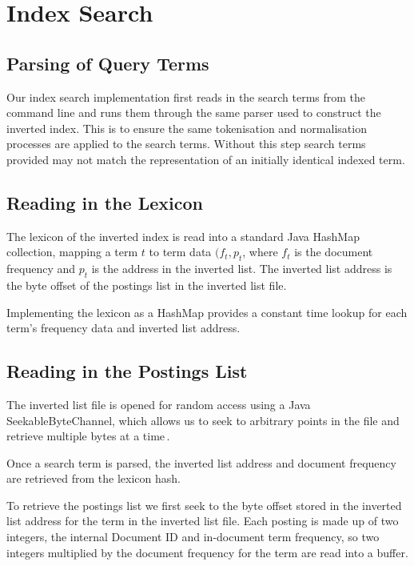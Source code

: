 
\section{Index Search}
\label{sec:querying}

\subsection*{Parsing of Query Terms}

Our index search implementation first reads in the search terms from the command line and runs them through the same parser used to construct the inverted index. This is to ensure the same tokenisation and normalisation processes are applied to the search terms. Without this step search terms provided may not match the representation of an initially identical indexed term.

\subsection*{Reading in the Lexicon}

The lexicon of the inverted index is read into a standard Java HashMap collection, mapping a term $t$ to term data $(f_t, p_t$, where $f_t$ is the document frequency and $p_t$ is the address in the inverted list. The inverted list address is the byte offset of the postings list in the inverted list file.

Implementing the lexicon as a HashMap provides a constant time lookup for each term's frequency data and inverted list address.

\subsection*{Reading in the Postings List}

The inverted list file is opened for random access using a Java SeekableByteChannel, which allows us to seek to arbitrary points in the file and retrieve multiple bytes at a time\,\cite{seekablebytechannel}.

Once a search term is parsed, the inverted list address and document frequency are retrieved from the lexicon hash.

To retrieve the postings list we first seek to the byte offset stored in the inverted list address for the term in the inverted list file. Each posting is made up of two integers, the internal Document ID and in-document term frequency, so two integers multiplied by the document frequency for the term are read into a buffer.

